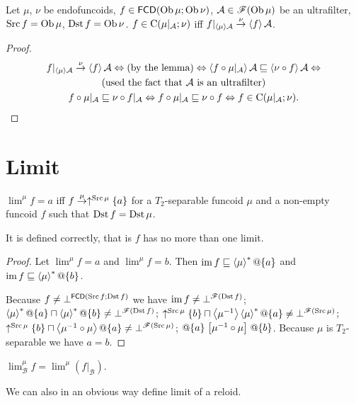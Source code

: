 \begin{thm}
Let $\mu$, $\nu$ be endofuncoids, $f\in\mathsf{FCD}(\operatorname{Ob}\mu;\operatorname{Ob}\nu)$,
$\mathcal{A}\in\mathscr{F}(\operatorname{Ob}\mu)$ be an ultrafilter, $\operatorname{Src} f=\operatorname{Ob}\mu$,
$\operatorname{Dst} f=\operatorname{Ob}\nu$. $f\in\mathrm{C}(\mu|_{\mathcal{A}};\nu)$ iff $f|_{\left\langle \mu\right\rangle\mathcal{A}}\overset{\nu}{\rightarrow}\left\langle f\right\rangle\mathcal{A}$.\end{thm}
\begin{proof}
~
\begin{multline*}
f|_{\left\langle \mu\right\rangle\mathcal{A}}\overset{\nu}{\rightarrow}\left\langle f\right\rangle\mathcal{A}\Leftrightarrow\text{(by the lemma)}\Leftrightarrow\left\langle f\circ\mu|_{\mathcal{A}}\right\rangle\mathcal{A}\sqsubseteq\left\langle \nu\circ f\right\rangle\mathcal{A}\Leftrightarrow\\
\text{(used the fact that \ensuremath{\mathcal{A}} is an ultrafilter)}\\
f\circ\mu|_{\mathcal{A}}\sqsubseteq\nu\circ f|_{\mathcal{A}}\Leftrightarrow f\circ\mu|_{\mathcal{A}}\sqsubseteq\nu\circ f\Leftrightarrow f\in\mathrm{C}(\mu|_{\mathcal{A}};\nu).
\end{multline*}

\end{proof}

\section{Limit}
\begin{defn}
$\lim^{\mu}f=a$ iff $f\overset{\mu}{\rightarrow}\uparrow^{\operatorname{Src}\mu}\{a\}$
for a $T_{2}$-separable funcoid $\mu$ and a non-empty funcoid $f$
such that $\operatorname{Dst} f=\operatorname{Dst}\mu$.
\end{defn}
It is defined correctly, that is $f$ has no more than one limit.
\begin{proof}
Let $\lim^{\mu}f=a$ and $\lim^{\mu}f=b$. Then $\operatorname{im} f\sqsubseteq\left\langle \mu\right\rangle ^{\ast}@\{a\}$
and $\operatorname{im} f\sqsubseteq\left\langle \mu\right\rangle ^{\ast}@\{b\}$.

Because $f\ne\bot^{\mathsf{FCD}(\operatorname{Src} f;\operatorname{Dst} f)}$ we have $\operatorname{im} f\ne\bot^{\mathscr{F}(\operatorname{Dst} f)}$;
$\left\langle \mu\right\rangle ^{\ast}@\{a\}\sqcap\left\langle \mu\right\rangle ^{\ast}@\{b\}\ne\bot^{\mathscr{F}(\operatorname{Dst} f)}$;
$\uparrow^{\operatorname{Src}\mu}\{b\}\sqcap\left\langle \mu^{-1}\right\rangle\left\langle \mu\right\rangle ^{\ast}@\{a\}\ne\bot^{\mathscr{F}(\operatorname{Src}\mu)}$;
$\uparrow^{\Src\mu}\{b\}\sqcap\supfun{\mu^{-1}\circ\mu}@\{a\}\ne\bot^{\mathscr{F}(\Src\mu)}$;
$@\{a\}\mathrel{\left[\mu^{-1}\circ\mu\right]}@\{b\}$.
Because $\mu$ is $T_{2}$-separable we have $a=b$.\end{proof}
\begin{defn}
$\lim_{\mathcal{B}}^{\mu}f=\lim^{\mu}(f|_{\mathcal{B}})$.\end{defn}
\begin{rem}
We can also in an obvious way define limit of a reloid.
\end{rem}

